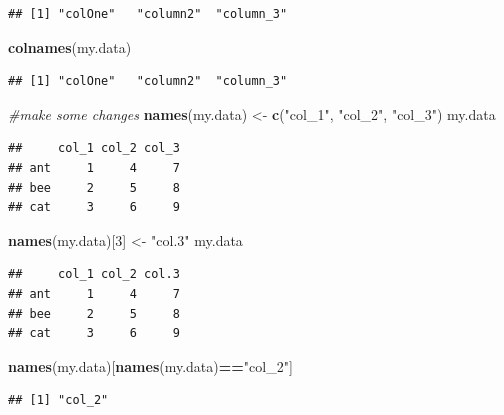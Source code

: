\documentclass[]{book}
\newenvironment{Shaded}{\begin{snugshade}}{\end{snugshade}}
\newcommand{\CommentTok}[1]{\textcolor[rgb]{0.56,0.35,0.01}{\textit{#1}}}
\newcommand{\DecValTok}[1]{\textcolor[rgb]{0.00,0.00,0.81}{#1}}
\newcommand{\KeywordTok}[1]{\textcolor[rgb]{0.13,0.29,0.53}{\textbf{#1}}}
\newcommand{\NormalTok}[1]{#1}
\newcommand{\OperatorTok}[1]{\textcolor[rgb]{0.81,0.36,0.00}{\textbf{#1}}}
\newcommand{\StringTok}[1]{\textcolor[rgb]{0.31,0.60,0.02}{#1}}
\begin{document}
\begin{verbatim}
## [1] "colOne"   "column2"  "column_3"
\end{verbatim}

\begin{Shaded}
\begin{Highlighting}[]
\KeywordTok{colnames}\NormalTok{(my.data)}
\end{Highlighting}
\end{Shaded}

\begin{verbatim}
## [1] "colOne"   "column2"  "column_3"
\end{verbatim}

\begin{Shaded}
\begin{Highlighting}[]
\CommentTok{#make some changes}
\KeywordTok{names}\NormalTok{(my.data) <-}\StringTok{ }\KeywordTok{c}\NormalTok{(}\StringTok{"col_1"}\NormalTok{, }\StringTok{"col_2"}\NormalTok{, }\StringTok{"col_3"}\NormalTok{)}
\NormalTok{my.data}
\end{Highlighting}
\end{Shaded}

\begin{verbatim}
##     col_1 col_2 col_3
## ant     1     4     7
## bee     2     5     8
## cat     3     6     9
\end{verbatim}

\begin{Shaded}
\begin{Highlighting}[]
\KeywordTok{names}\NormalTok{(my.data)[}\DecValTok{3}\NormalTok{] <-}\StringTok{ "col.3"}
\NormalTok{my.data}
\end{Highlighting}
\end{Shaded}

\begin{verbatim}
##     col_1 col_2 col.3
## ant     1     4     7
## bee     2     5     8
## cat     3     6     9
\end{verbatim}

\begin{Shaded}
\begin{Highlighting}[]
\KeywordTok{names}\NormalTok{(my.data)[}\KeywordTok{names}\NormalTok{(my.data)}\OperatorTok{==}\StringTok{"col_2"}\NormalTok{]}
\end{Highlighting}
\end{Shaded}

\begin{verbatim}
## [1] "col_2"
\end{verbatim}
\end{document}
